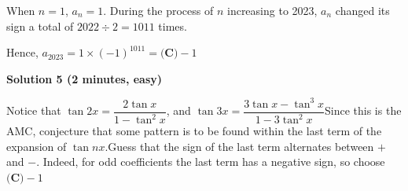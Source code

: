 \begin{enumerate}
 When $n = 1$, $a_n = 1$. During the process of $n$ increasing to 2023, $a_n$ changed its sign a total of $2022 \div 2 = 1011$ times.

 Hence, $a_{2023} = 1 \times (-1)^{1011} = \boxed{\textbf{(C)}-1}$




\textbf{Solution 5 (2 minutes, easy)}

Notice that $\tan 2x = \dfrac{2 \tan x}{1 - \tan^2 x}$, and $\tan 3x = \dfrac{3 \tan x - \tan^3 x}{1-3 \tan^2 x}$Since this is the AMC, conjecture that some pattern is to be found within the last term of the expansion of $\tan nx$.Guess that the sign of the last term alternates between $+$ and $-$. Indeed, for odd coefficients the last term has a negative sign, so choose $\boxed{\textbf{(C)}-1}$



\end{enumerate}